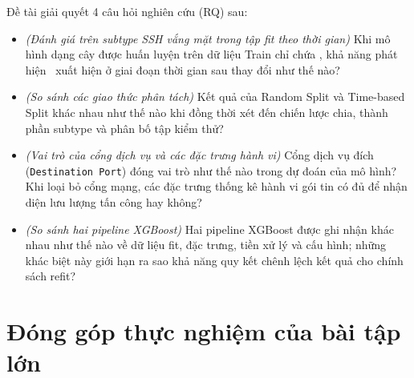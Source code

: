 Đề tài giải quyết 4 câu hỏi nghiên cứu (RQ) sau:
\begin{itemize}
    \item[\textbf{RQ1:}] \textit{(Đánh giá trên subtype SSH vắng mặt trong tập fit theo thời gian)} Khi mô hình dạng cây được huấn luyện trên dữ liệu Train chỉ chứa \FTP, khả năng phát hiện \SSH\ xuất hiện ở giai đoạn thời gian sau thay đổi như thế nào?
    \item[\textbf{RQ2:}] \textit{(So sánh các giao thức phân tách)} Kết quả của Random Split và Time-based Split khác nhau như thế nào khi đồng thời xét đến chiến lược chia, thành phần subtype và phân bố tập kiểm thử?
    \item[\textbf{RQ3:}] \textit{(Vai trò của cổng dịch vụ và các đặc trưng hành vi)} Cổng dịch vụ đích (\texttt{Destination Port}) đóng vai trò như thế nào trong dự đoán của mô hình? Khi loại bỏ cổng mạng, các đặc trưng thống kê hành vi gói tin có đủ để nhận diện lưu lượng tấn công hay không?
    \item[\textbf{RQ4:}] \textit{(So sánh hai pipeline XGBoost)} Hai pipeline XGBoost được ghi nhận khác nhau như thế nào về dữ liệu fit, đặc trưng, tiền xử lý và cấu hình; những khác biệt này giới hạn ra sao khả năng quy kết chênh lệch kết quả cho chính sách refit?
\end{itemize}

\section{Đóng góp thực nghiệm của bài tập lớn}

